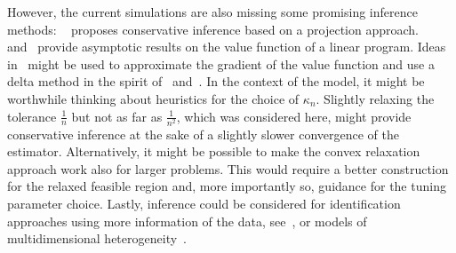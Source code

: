 \documentclass[12pt,a4paper,english]{article} %
\numberwithin{equation}{section}
\theoremstyle{definition}
\theoremstyle{remark}
\theoremstyle{plain}
\begin{document}
However, the current simulations are also missing some promising inference methods:
~\cite{bei2023inference} proposes conservative inference based on a projection approach.~\cite{bhattacharya2009inferring} and~\cite{freyberger2015identification} provide asymptotic results on the value function of a linear program.
Ideas in~\cite{de_wolf_smeers2021generalized} might be used to approximate the gradient of the value function and use a delta method in the spirit of~\cite{shapiro1991asymptotic} and~\cite{fang2019infdirdiff}.
In the context of the model, it might be worthwhile thinking about heuristics for the choice of $\kappa_n$.
Slightly relaxing the tolerance $\frac{1}{n}$ but not as far as $\frac{1}{n^2}$, which was considered here, might provide conservative inference at the sake of a slightly slower convergence of the estimator.
Alternatively, it might be possible to make the convex relaxation approach work also for larger problems.
This would require a better construction for the relaxed feasible region and, more importantly so, guidance for the tuning parameter choice.
Lastly, inference could be considered for identification approaches using more information of the data, see~\cite{marx2024sharp}, or models of multidimensional heterogeneity~\cite{dutz2021selection}.

\clearpage
\newpage





\clearpage
\newpage


\appendix
{}
\end{document}
